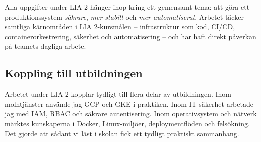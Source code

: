 Alla uppgifter under LIA 2 hänger ihop kring ett gemensamt tema: att göra ett produktionssystem
\textit{säkrare}, \textit{mer stabilt} och \textit{mer automatiserat}. Arbetet täcker samtliga
kärnområden i LIA 2-kursmålen -- infrastruktur som kod, CI/CD, containerorkestrering,
säkerhet och automatisering -- och har haft direkt påverkan på teamets dagliga arbete.

\subsection*{Koppling till utbildningen}

Arbetet under LIA 2 kopplar tydligt till flera delar av utbildningen. Inom molntjänster använde
jag GCP och GKE i praktiken. Inom IT-säkerhet arbetade jag med IAM, RBAC och säkrare
autentisering. Inom operativsystem och nätverk märktes kunskaperna i Docker, Linux-miljöer,
deploymentflöden och felsökning. Det gjorde att sådant vi läst i skolan fick ett tydligt
praktiskt sammanhang.